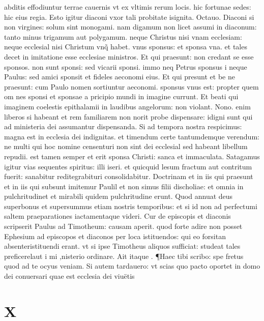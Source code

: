 \documentclass{article}
\begin{document}
\begin{pages}
abditis effodiuntur terrae cauernis vt ex vltimis rerum locis. hic fortunae sedes: hic eius regia. Esto igitur diaconi vxor tali probitate isignita. Octauo. Diaconi si non virgines: solum sint monogami. nam digamum non licet assumi in diaconum: tanto minus trigamum aut polygamum. neque Christus nisi vnam ecclesiam: neque ecclesial nisi Christum vnq̃ habet. vnus sponsus: et sponsa vna. et tales decet in imitatione esse ecclesiae ministros. Et qui praesunt: non credant se esse sponsos. non sunt sponsi: sed vicarii sponsi. immo neq Petrus sponsus i neque Paulus: sed amici sponsit et fideles aeconomi eius. Et qui presunt et be ne praesunt: cum Paulo nomen sortiuntur aeconomi. sponsus vnus est: propter quem om nes sponsi et sponsae a pricipio mundi in imagine currunt. Et beati qui imaginem coelestis epithalamii in laudibus angelorum: non violant. Nono. enim liberos si habeant et rem familiarem non norit probe dispensare: idigni sunt qui ad ministeria dei assumantur dispensanda. Si ad tempora nostra respicimus: magna est in ecclesia dei indignitas. et timendum certe tantumdemque verendum: ne multi qui hoc nomine censenturi non sint dei ecclesial sed habeant libellum repudii. est tamen semper et erit sponsa Christi: sanca et immaculata. Satagamus igitur vias sequentes spiritus: illi iseri. et quicquid lesum fractum aut contritum fuerit: sanabitur reditegrabituri consolidabitur. Doctrinam et in iis qui praesunt et in iis qui subsunt imitemur Paulil et non simus filii discholiae: et omnia in pulchritudinet et mirabili quidem pulchritudine erunt. Quod annuat deus superbonus et supersummus etiam nostris temporibus: et si id non ad perfectumi saltem praeparationes iactamentaque videri. Cur de episcopis et diaconis scripserit Paulus ad Timotheum: causam aperit. quod forte adire non posset Ephesium ad episcopos et diaconos per loca istituendos: qui eo forsitan absenteristituendi erant. vt si ipse Timotheus aliquos sufficiat: studeat tales preficerelaut i mi ,nisterio ordinare. Ait itaque . ¶Haec tibi scribo: spe fretus quod ad te ocyus veniam. Si autem  tardauero: vt scias quo pacto oportet in domo dei conuersari quae est ecclesia dei viuëtis  \pend
\section*{X }

\end{pages}
\end{document}
